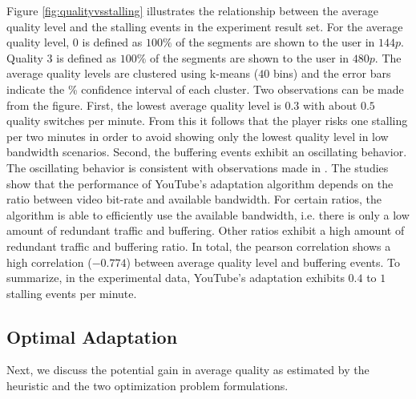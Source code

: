 Figure \ref{fig:qualityvsstalling} illustrates the relationship between the average quality level and the stalling events in the experiment result set.
For the average quality level, $0$ is defined as $100\%$ of the segments are shown to the user in $144p$. Quality $3$ is defined as $100\%$ of the segments are shown to the user in $480p$.
The average quality levels are clustered using k-means ($40$ bins) and the error bars indicate the \unit[95]{\%} confidence interval of each cluster.
Two observations can be made from the figure. 
First, the lowest average quality level is $0.3$ with about $0.5$ quality switches per minute.
From this it follows that the player risks one stalling per two minutes in order to avoid showing only the lowest quality level in low bandwidth scenarios.
Second, the buffering events exhibit an oscillating behavior.
The oscillating behavior is consistent with observations made in \cite{sieber16sacrificing, casas2012youtube}.
The studies show that the performance of YouTube's adaptation algorithm depends on the ratio between video bit-rate and available bandwidth.
For certain ratios, the algorithm is able to efficiently use the available bandwidth, i.e. there is only a low amount of redundant traffic and buffering.
Other ratios exhibit a high amount of redundant traffic and buffering ratio.
In total, the pearson correlation shows a high correlation ($-0.774$) between average quality level and buffering events.
To summarize, in the experimental data, YouTube's adaptation exhibits $0.4$ to $1$ stalling events per minute.

\subsection{Optimal Adaptation}

Next, we discuss the potential gain in average quality as estimated by the heuristic and the two optimization problem formulations. 

